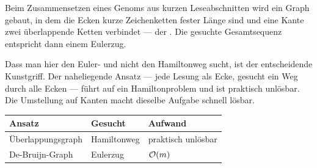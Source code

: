 \begin{forschung}
Beim Zusammensetzen eines Genoms aus kurzen Leseabschnitten wird ein Graph gebaut, in dem die Ecken kurze Zeichenketten fester Länge sind und eine Kante zwei überlappende Ketten verbindet --- der . Die gesuchte Gesamtsequenz entspricht dann einem Eulerzug.

Dass man hier den Euler- und nicht den Hamiltonweg sucht, ist der entscheidende Kunstgriff. Der naheliegende Ansatz --- jede Lesung als Ecke, gesucht ein Weg durch alle Ecken --- führt auf ein Hamiltonproblem und ist praktisch unlösbar. Die Umstellung auf Kanten macht dieselbe Aufgabe schnell lösbar.

\begin{center}
{\small
\renewcommand{\arraystretch}{1.42}
\begin{tabular}{@{}P{3.0cm}P{2.2cm}P{2.8cm}@{}}
\toprule
\textbf{Ansatz} & \textbf{Gesucht} & \textbf{Aufwand}\\
\midrule
Überlappungs\-graph & Hamiltonweg & \textcolor{akzent}{praktisch unlösbar}\\
De-Bruijn-Graph & Eulerzug & \textcolor{gruen}{$\mathcal{O}(m)$}\\
\bottomrule
\end{tabular}}
\end{center}

\begin{center}
\begin{minipage}{0.88\textwidth}
\end{minipage}
\end{center}
\end{forschung}

